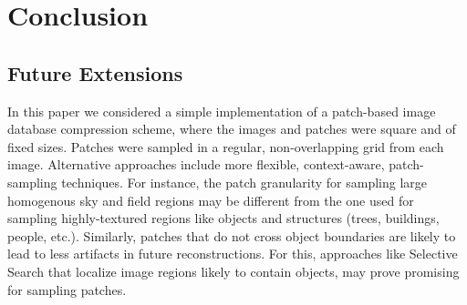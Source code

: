 \section{Conclusion}
\subsection{Future Extensions}
\label{sec:futureext}

In this paper we considered a simple implementation of a patch-based image database compression scheme, where the images and patches were square and of fixed sizes. Patches were sampled in a regular, non-overlapping grid from each image.  Alternative approaches include more flexible, context-aware, patch-sampling techniques. For instance, the patch granularity for sampling large homogenous sky and field regions may be different from the one used for sampling highly-textured regions like objects and structures (trees, buildings, people, etc.). Similarly, patches that do not cross object boundaries are likely to lead to less artifacts in future reconstructions. For this, approaches like Selective Search \cite{UijlingsIJCV2013} that localize image regions likely to contain objects, may prove promising for sampling patches.
